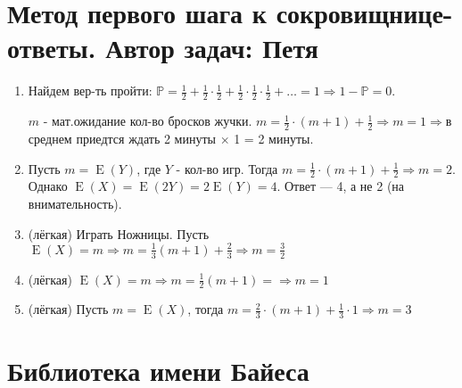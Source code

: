 \documentclass[a4paper,12pt]{article}
\DeclareMathOperator{\E}{E}
\def \P{\mathbb{P}}
\begin{document}
\newpage

\section{Метод первого шага к сокровищнице-ответы. Автор задач: Петя}


\begin{enumerate}
\item Найдем вер-ть пройти: $\P = \frac{1}{2} + \frac{1}{2} \cdot \frac{1}{2} + \frac{1}{2}\cdot\frac{1}{2}\cdot\frac{1}{2} + \dots  = 1 \Rightarrow 1 - \P = 0$.

$m$ - мат.ожидание кол-во бросков жучки. $m=\frac{1}{2}\cdot(m+1) + \frac{1}{2} \Rightarrow m = 1 \Rightarrow $в среднем приедтся ждать 2 минуты $\times$ 1 = 2 минуты.
\item Пусть $m = \E(Y)$, где $Y$ - кол-во игр. Тогда $m = \frac{1}{2} \cdot (m+1) + \frac{1}{2} \Rightarrow m = 2$. Однако $\E(X) = \E(2Y) = 2 \E(Y) = 4$. Ответ — 4, а не 2 (на внимательность).
\item (лёгкая) Играть Ножницы. Пусть $\E(X) = m \Rightarrow m = \frac{1}{3}(m+1) + \frac{2}{3} \Rightarrow m = \frac{3}{2}$
\item (лёгкая) $\E(X) = m \Rightarrow m = \frac{1}{2}(m+1) =\Rightarrow m = 1$
\item (лёгкая) Пусть $m = \E(X)$, тогда $m = \frac{2}{3}\cdot(m+1) + \frac{1}{3} \cdot 1 \Rightarrow m = 3$
\end{enumerate}

\newpage
\section{Библиотека имени Байеса} %
\end{document}
